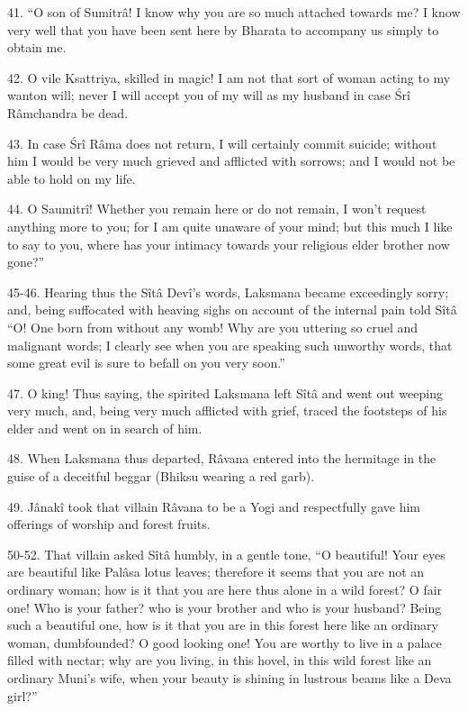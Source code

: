 41. ``O son of Sumitr\^a! I know why you are so much attached towards me? I know very well that you have been sent here by Bharata to accompany us simply to obtain me.

42. O vile Ksattriya, skilled in magic! I am not that sort of woman acting to my wanton will; never I will accept you of my will as my husband in case \'Sr\^i R\^amchandra be dead.

43. In case \'Sr\^i R\^ama does not return, I will certainly commit suicide; without him I would be very much grieved and afflicted with sorrows; and I would not be able to hold on my life.

44. O Saumitr\^i! Whether you remain here or do not remain, I won't request anything more to you; for I am quite unaware of your mind; but this much I like to say to you, where has your intimacy towards your religious elder brother now gone?''

45-46. Hearing thus the S\^it\^a Dev\^i's words, Laksmana became exceedingly sorry; and, being suffocated with heaving sighs on account of the internal pain told S\^it\^a ``O! One born from without any womb! Why are you uttering so cruel and malignant words; I clearly see when you are speaking such unworthy words, that some great evil is sure to befall on you very soon.''

47. O king! Thus saying, the spirited Laksmana left S\^it\^a and went out weeping very much, and, being very much afflicted with grief, traced the footsteps of his elder and went on in search of him.

48. When Laksmana thus departed, R\^avana entered into the hermitage in the guise of a deceitful beggar (Bhiksu wearing a red garb).

49. J\^anak\^i took that villain R\^avana to be a Yogi and respectfully gave him offerings of worship and forest fruits.

50-52. That villain asked S\^it\^a humbly, in a gentle tone, ``O beautiful! Your eyes are beautiful like Pal\^asa lotus leaves; therefore it seems that you are not an ordinary woman; how is it that you are here thus alone in a wild forest? O fair one! Who is your father? who is your brother and who is your husband? Being such a beautiful one, how is it that you are in this forest here like an ordinary woman, dumbfounded? O good looking one! You are worthy to live in a palace filled with nectar; why are you living, in this hovel, in this wild forest like an ordinary Muni's wife, when your beauty is shining in lustrous beams like a Deva girl?''

